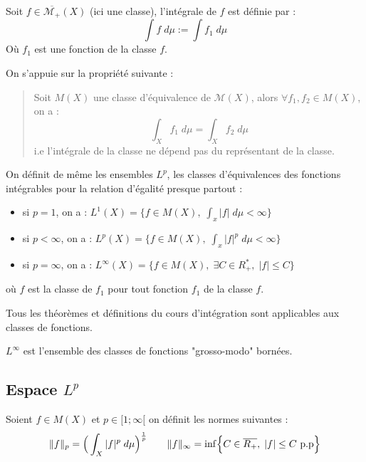 \begin{definition}
    Soit $f \in \overline{\mathcal{M}_+}(X)$ (ici une classe), l'intégrale de $f$ est définie par :
        \[ \int f \;d \mu := \int f_1 \; d \mu \] 
    Où $f_1$ est une fonction de la classe $f$. 
\end{definition}

\begin{remark}
    On s'appuie sur la propriété suivante :
    \begin{quote}
        Soit $M(X)$ une classe d'équivalence de $\mathcal{M}(X)$, alors $ \forall f_1,f_2 \in M(X)$, on a :
            \[ \int_X f_1 \; d \mu = \int_X f_2 \; d \mu \] 
        i.e l'intégrale de la classe ne dépend pas du représentant de la classe. 
    \end{quote}
\end{remark}


\begin{definition}[Espace $L^p$]
    On définit de même les ensembles $L^p$, les classes d'équivalences des fonctions intégrables pour la relation d'égalité 
    presque partout : 
    \begin{itemize}
        \item si $p=1$, on a : $ L^1(X) = \{ f \in M(X), \; \int_x |f| \; d \mu < \infty \} $
        \item si $p < \infty$, on a : $L^p(X) = \{ f \in M(X), \; \int_x |f|^p \; d \mu < \infty \}$
        \item si $p = \infty$, on a : $L^\infty(X) = \{ f \in M(X), \; \exists C \in R_+^*, \; |f| \leq C \}$
    \end{itemize}
    où $f$ est la classe de $f_1$ pour tout fonction $f_1$ de la classe $f$.
\end{definition}

\begin{theorem}[Extension]
    Tous les théorèmes et définitions du cours d'intégration sont applicables aux classes de fonctions. 
\end{theorem}

$L^\infty$ est l'ensemble des classes de fonctions "grosso-modo" bornées. 


\subsection{Espace $L^p$}

\begin{definition}[Normes $L^p$]
    Soient $f \in M(X)$ et $p \in [1;\infty[$ on définit les normes suivantes :
    \[ 
        \|f\|_p = \Big( \int_X |f|^p \; d \mu \Big)^{\frac{1}{p}} \qquad 
        \|f\|_\infty  = \inf \Bigl\{ C \in \overline{R_+}, \; |f| \leq C \text{ p.p} \Bigr\}
    \]
\end{definition}

